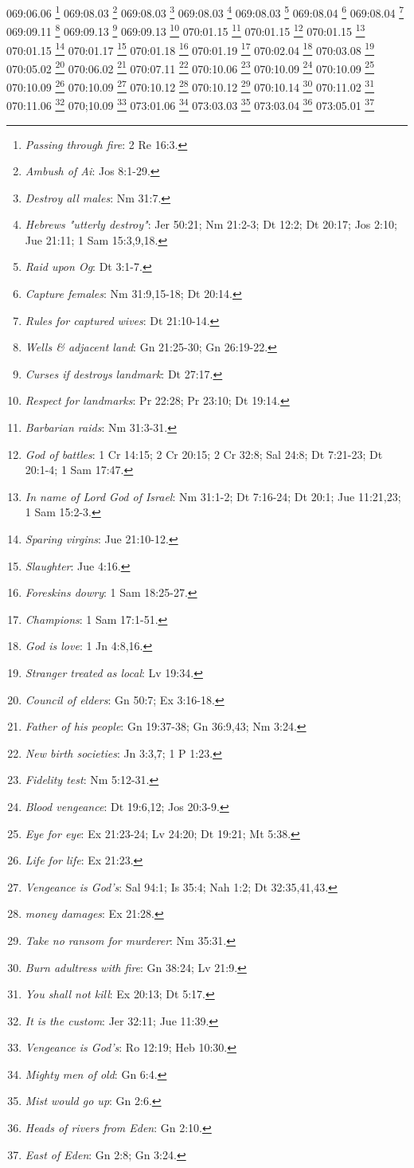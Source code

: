 069:06.06 \footnote{\textit{Passing through fire}: 2 Re 16:3.}
069:08.03 \footnote{\textit{Ambush of Ai}: Jos 8:1-29.}
069:08.03 \footnote{\textit{Destroy all males}: Nm 31:7.}
069:08.03 \footnote{\textit{Hebrews "utterly destroy"}: Jer 50:21; Nm 21:2-3; Dt 12:2; Dt 20:17; Jos 2:10; Jue 21:11; 1 Sam 15:3,9,18.}
069:08.03 \footnote{\textit{Raid upon Og}: Dt 3:1-7.}
069:08.04 \footnote{\textit{Capture females}: Nm 31:9,15-18; Dt 20:14.}
069:08.04 \footnote{\textit{Rules for captured wives}: Dt 21:10-14.}
069:09.11 \footnote{\textit{Wells & adjacent land}: Gn 21:25-30; Gn 26:19-22.}
069:09.13 \footnote{\textit{Curses if destroys landmark}: Dt 27:17.}
069:09.13 \footnote{\textit{Respect for landmarks}: Pr 22:28; Pr 23:10; Dt 19:14.}
070:01.15 \footnote{\textit{Barbarian raids}: Nm 31:3-31.}
070:01.15 \footnote{\textit{God of battles}: 1 Cr 14:15; 2 Cr 20:15; 2 Cr 32:8; Sal 24:8; Dt 7:21-23; Dt 20:1-4; 1 Sam 17:47.}
070:01.15 \footnote{\textit{In name of Lord God of Israel}: Nm 31:1-2; Dt 7:16-24; Dt 20:1; Jue 11:21,23; 1 Sam 15:2-3.}
070:01.15 \footnote{\textit{Sparing virgins}: Jue 21:10-12.}
070:01.17 \footnote{\textit{Slaughter}: Jue 4:16.}
070:01.18 \footnote{\textit{Foreskins dowry}: 1 Sam 18:25-27.}
070:01.19 \footnote{\textit{Champions}: 1 Sam 17:1-51.}
070:02.04 \footnote{\textit{God is love}: 1 Jn 4:8,16.}
070:03.08 \footnote{\textit{Stranger treated as local}: Lv 19:34.}
070:05.02 \footnote{\textit{Council of elders}: Gn 50:7; Ex 3:16-18.}
070:06.02 \footnote{\textit{Father of his people}: Gn 19:37-38; Gn 36:9,43; Nm 3:24.}
070:07.11 \footnote{\textit{New birth societies}: Jn 3:3,7; 1 P 1:23.}
070:10.06 \footnote{\textit{Fidelity test}: Nm 5:12-31.}
070:10.09 \footnote{\textit{Blood vengeance}: Dt 19:6,12; Jos 20:3-9.}
070:10.09 \footnote{\textit{Eye for eye}: Ex 21:23-24; Lv 24:20; Dt 19:21; Mt 5:38.}
070:10.09 \footnote{\textit{Life for life}: Ex 21:23.}
070:10.09 \footnote{\textit{Vengeance is God's}: Sal 94:1; Is 35:4; Nah 1:2; Dt 32:35,41,43.}
070:10.12 \footnote{\textit{money damages}: Ex 21:28.}
070:10.12 \footnote{\textit{Take no ransom for murderer}: Nm 35:31.}
070:10.14 \footnote{\textit{Burn adultress with fire}: Gn 38:24; Lv 21:9.}
070:11.02 \footnote{\textit{You shall not kill}: Ex 20:13; Dt 5:17.}
070:11.06 \footnote{\textit{It is the custom}: Jer 32:11; Jue 11:39.}
070;10.09 \footnote{\textit{Vengeance is God's}: Ro 12:19; Heb 10:30.}
073:01.06 \footnote{\textit{Mighty men of old}: Gn 6:4.}
073:03.03 \footnote{\textit{Mist would go up}: Gn 2:6.}
073:03.04 \footnote{\textit{Heads of rivers from Eden}: Gn 2:10.}
073:05.01 \footnote{\textit{East of Eden}: Gn 2:8; Gn 3:24.}
